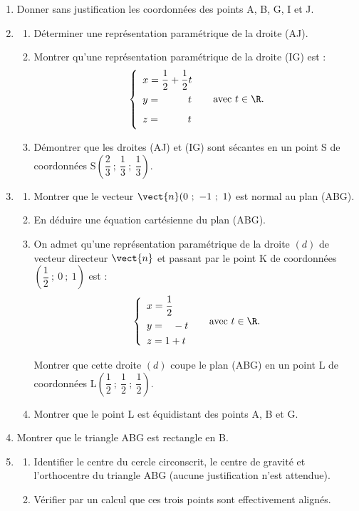 	\begin{enumerate}
		\item Donner sans justification les coordonnées des points A, B, G, I et J.

		\item \begin{enumerate}
			\item Déterminer une représentation paramétrique de la droite (AJ).

			\item Montrer qu'une représentation paramétrique de la droite (IG) est : \[\left\{\begin{array}{l}x=\dfrac{1}{2}+\dfrac{1}{2} t \\ y=\phantom{\dfrac{1}{2}+\dfrac{1}{2}}t \\ z=\phantom{\dfrac{1}{2}+\dfrac{1}{2}}t\end{array} \right.\quad\text{ avec }t \in \R.\]

			\item Démontrer que les droites (AJ) et (IG) sont sécantes en un point S de coordonnées S$\left(\dfrac{2}{3} ~;~ \dfrac{1}{3} ~;~ \dfrac{1}{3}\right)$.
		\end{enumerate}

		\item \begin{enumerate}
			\item Montrer que le vecteur $\vect{n}(0 ~;~-1 ~;~ 1)$ est normal au plan (ABG).

			\item En déduire une équation cartésienne du plan (ABG).

			\item On admet qu'une représentation paramétrique de la droite $(d)$ de vecteur directeur $\vect{n}$ et passant par le point K de coordonnées $\left(\dfrac{1}{2} ~;~ 0 ~;~ 1\right)$ est : \[\left\{\begin{array}{l}
x=\dfrac{1}{2} \\
 y= \phantom{\dfrac{1}{2}}- t \\
  z=1+t\end{array} \right.\quad\text{ avec }t \in \R.\]

			Montrer que cette droite $(d)$ coupe le plan (ABG) en un point L de coordonnées L$\left(\dfrac{1}{2} ~;~ \dfrac{1}{2} ~;~ \dfrac{1}{2}\right)$.

			\item Montrer que le point L est équidistant des points A, B et G.
		\end{enumerate}

		\item Montrer que le triangle ABG est rectangle en B.

		\item \begin{enumerate}
			\item Identifier le centre du cercle circonscrit, le centre de gravité et l'orthocentre du triangle ABG (aucune justification n'est attendue).

			\item Vérifier par un calcul que ces trois points sont effectivement alignés.
		\end{enumerate}
	\end{enumerate}
